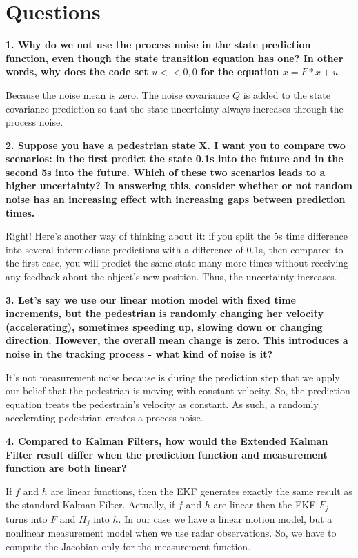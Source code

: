\documentclass[11pt, a4paper]{article}
\begin{document}
\section{Questions}%
\label{sec:questions}


\textbf{1. Why do we not use the process noise in the state prediction function, even though the state transition equation has one? In other words, why does the code set $u << 0,0$ for the equation $x = F * x + u$}


Because the noise mean is zero.
The noise covariance $Q$ is added to the state covariance prediction so that the state uncertainty always increases through the process noise. 


\textbf{2. Suppose you have a pedestrian state X. I want you to compare two scenarios: in the first predict the state 0.1s into the future and in the second 5s into the future. Which of these two scenarios leads to a higher uncertainty? In answering this, consider whether or not random noise has an increasing effect with increasing gaps between prediction times.}

Right! Here's another way of thinking about it: if you split the 5s time difference into several intermediate predictions with a difference of 0.1s, then compared to the first case, you will predict the same state many more times without receiving any feedback about the object's new position. Thus, the uncertainty increases.



\textbf{3. Let's say we use our linear motion model with fixed time increments, but the pedestrian is randomly changing her velocity (accelerating), sometimes speeding up, slowing down or changing direction. However, the overall mean change is zero. This introduces a noise in the tracking process - what kind of noise is it?}

It's not measurement noise because is during the prediction step that we apply our belief that the pedestrian is moving with constant velocity. So, the prediction equation treats the pedestrain's velocity as constant. As such, a randomly accelerating pedestrian creates a process noise.


\textbf{4. Compared to Kalman Filters, how would the Extended Kalman Filter result differ when the prediction function and measurement function are both linear?}

If $f$ and $h$ are linear functions, then the EKF generates exactly the same result as the standard Kalman Filter. Actually, if $f$ and $h$ are linear then the EKF $F_j$ turns into $F$ and $H_j$ into $h$.
In our case we have a linear motion model, but a nonlinear measurement model when we use radar observations. So, we have to compute the Jacobian only for the measurement function.
\end{document}
